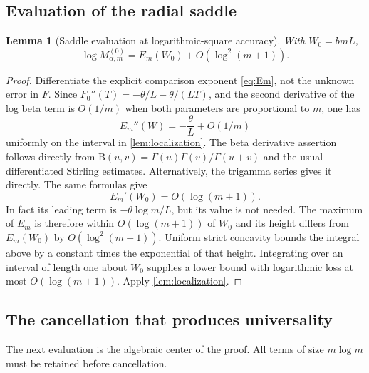 \documentclass[11pt,a4paper]{article}
\numberwithin{equation}{section}
\newtheorem{lemma}[lemma]{Lemma}
\theoremstyle{definition}\newaliascnt{definition}{theorem}
\theoremstyle{remark}\newaliascnt{remark}{theorem}
\newcommand{\Bf}{\mathrm B}
\begin{document}
\subsection{Evaluation of the radial saddle}
\begin{lemma}[Saddle evaluation at logarithmic-square accuracy]
\label{lem:radial}
With $W_0=bmL$,
\begin{equation}
 \log M_{\alpha,m}^{(0)}=E_m(W_0)+O(\log^2(m+1)).
 \label{eq:radial-evaluation}
\end{equation}
\end{lemma}
\begin{proof}
Differentiate the explicit comparison exponent \eqref{eq:Em}, not the
unknown error in $F$. Since
$F_0''(T)=-\theta/L-\theta/(LT)$, and the second derivative of the log beta
term is $O(1/m)$ when both parameters are proportional to $m$, one has
\begin{equation}
 E_m''(W)=-\frac{\theta}{L}+O(1/m)
 \label{eq:Em-concavity}
\end{equation}
uniformly on the interval in \cref{lem:localization}. The beta derivative
assertion follows directly from
$\Bf(u,v)=\Gamma(u)\Gamma(v)/\Gamma(u+v)$ and the usual differentiated
Stirling estimates. Alternatively, the trigamma series gives it directly.
The same formulas give
\begin{equation}
 E_m'(W_0)=O(\log(m+1)).
 \label{eq:Em-first-derivative}
\end{equation}
In fact its leading term is $-\theta\log m/L$, but its value is not needed.
The maximum of $E_m$ is therefore within $O(\log(m+1))$ of $W_0$ and its
height differs from $E_m(W_0)$ by $O(\log^2(m+1))$.
Uniform strict concavity bounds the integral above by a constant times the
exponential of that height. Integrating over an interval of length one about
$W_0$ supplies a lower bound with logarithmic loss at most $O(\log(m+1))$.
Apply \cref{lem:localization}.
\end{proof}

\subsection{The cancellation that produces universality}
The next evaluation is the algebraic center of the proof. All terms of size
$m\log m$ must be retained before cancellation.
\end{document}
